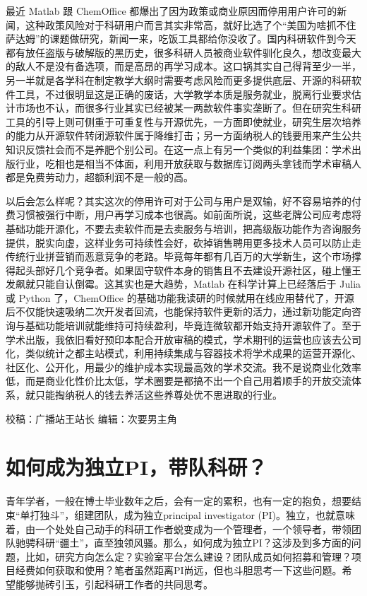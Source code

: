 \documentclass[
]{book}
\begin{document}
最近 Matlab 跟 ChemOffice 都爆出了因为政策或商业原因而停用用户许可的新闻，这种政策风险对于科研用户而言其实非常高，就好比选了个``美国为啥抓不住萨达姆''的课题做研究，新闻一来，吃饭工具都给你没收了。国内科研软件到今天都有放任盗版与破解版的黑历史，很多科研人员被商业软件驯化良久，想改变最大的敌人不是没有备选项，而是高昂的再学习成本。这口锅其实自己得背至少一半，另一半就是各学科在制定教学大纲时需要考虑风险而更多提供底层、开源的科研软件工具，不过很明显这是正确的废话，大学教学本质是服务就业，脱离行业要求估计市场也不认，而很多行业其实已经被某一两款软件事实垄断了。但在研究生科研工具的引导上则可侧重于可重复性与开源优先，一方面即使就业，研究生层次培养的能力从开源软件转闭源软件属于降维打击；另一方面纳税人的钱要用来产生公共知识反馈社会而不是养肥个别公司。在这一点上有另一个类似的利益集团：学术出版行业，吃相也是相当不体面，利用开放获取与数据库订阅两头拿钱而学术审稿人都是免费劳动力，超额利润不是一般的高。

以后会怎么样呢？其实这次的停用许可对于公司与用户是双输，好不容易培养的付费习惯被强行中断，用户再学习成本也很高。如前面所说，这些老牌公司应考虑将基础功能开源化，不要去卖软件而是去卖服务与培训，把高级版功能作为咨询服务提供，脱实向虚，这样业务可持续性会好，砍掉销售聘用更多技术人员可以防止走传统行业拼营销而恶意竞争的老路。毕竟每年都有几百万的大学新生，这个市场撑得起头部好几个竞争者。如果固守软件本身的销售且不去建设开源社区，碰上懂王发飙就只能自认倒霉。这其实也是大趋势，Matlab 在科学计算上已经落后于 Julia 或 Python 了，ChemOffice 的基础功能我读研的时候就用在线应用替代了，开源后不仅能快速吸纳二次开发者回流，也能保持软件更新的活力，通过新功能定向咨询与基础功能培训就能维持可持续盈利，毕竟连微软都开始支持开源软件了。至于学术出版，我依旧看好预印本配合开放审稿的模式，学术期刊的运营也应该去公司化，类似统计之都主站模式，利用持续集成与容器技术将学术成果的运营开源化、社区化、公开化，用最少的维护成本实现最高效的学术交流。我不是说商业化效率低，而是商业化性价比太低，学术圈要是都搞不出一个自己用着顺手的开放交流体系，就只能掏纳税人的钱去养活这些养尊处优不思进取的行业。

校稿：广播站王站长
编辑：次要男主角

\hypertarget{ux5982ux4f55ux6210ux4e3aux72ecux7acbpiux5e26ux961fux79d1ux7814}{%
\section{如何成为独立PI，带队科研？}\label{ux5982ux4f55ux6210ux4e3aux72ecux7acbpiux5e26ux961fux79d1ux7814}}

青年学者，一般在博士毕业数年之后，会有一定的累积，也有一定的抱负，想要结束``单打独斗''，组建团队，成为独立principal investigator (PI)。独立，也就意味着，由一个处处自己动手的科研工作者蜕变成为一个管理者，一个领导者，带领团队驰骋科研``疆土''，直至独领风骚。那么，如何成为独立PI？这涉及到多方面的问题，比如，研究方向怎么定？实验室平台怎么建设？团队成员如何招募和管理？项目经费如何获取和使用？笔者虽然距离PI尚远，但也斗胆思考一下这些问题。希望能够抛砖引玉，引起科研工作者的共同思考。
\end{document}
